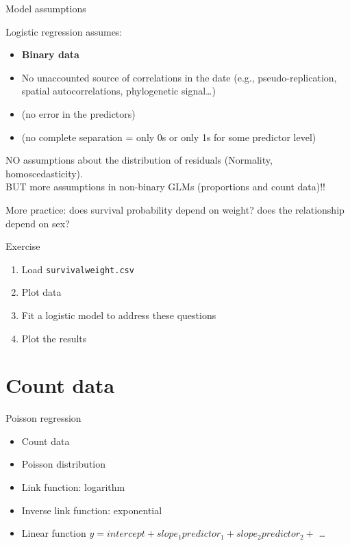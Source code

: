 \documentclass[10pt]{beamer}
\begin{document}
\begin{frame}{Model assumptions}
\begin{block}{Logistic regression assumes:}
\begin{itemize}[<+->]
  \item \textbf{Binary data}
  \item No unaccounted source of correlations in the date (e.g., pseudo-replication, spatial autocorrelations, phylogenetic signal\dots)
  \item (no error in the predictors)
  \item (no complete separation = only 0s or only 1s for some predictor level)
\end{itemize}
\end{block}

\pause

NO assumptions about the distribution of residuals (Normality, homoscedasticity).\\
BUT more assumptions in non-binary GLMs (proportions and count data)!!

\end{frame}

\begin{frame}{More practice: does survival probability depend on weight? does the relationship depend on sex?}
 
  \begin{exampleblock}{Exercise}
    \begin{enumerate}
      \item Load \texttt{survivalweight.csv}
      \item Plot data
      \item Fit a logistic model to address these questions
      \item Plot the results
    \end{enumerate}
  \end{exampleblock}
 \end{frame}


\section{Count data}

\begin{frame}{Poisson regression}
  \begin{itemize}
    \item Count data
    \item Poisson distribution
    \item Link function: logarithm
    \item Inverse link function: exponential
    \item Linear function $y = intercept + slope_1 predictor_1 + slope_2 predictor_2 +$ \dots
  \end{itemize}
\end{frame}
\end{document}
